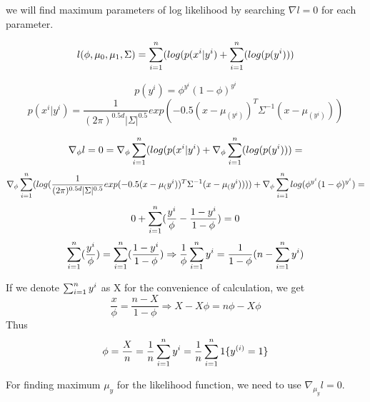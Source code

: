 \begin{answer}
we will find maximum parameters of log likelihood by searching $\nabla l = 0$ for each parameter. 

  \begin{equation*}
      l(\phi,\mu_0, \mu_1, \Sigma) 
      = \sum_{i=1}^{n}(log(p(x^{i}|y^{i}) + \sum_{i=1}^{n}(log(p(y^{i})))
  \end{equation*}
  
  \begin{equation*}
      p(y^{i}) = \phi^{y^{i}}(1-\phi)^{y^{i}}
\end{equation*}
\begin{equation*}
      p(x^{i}|y^{i}) = \frac{1}{(2\pi)^{0.5d}|\Sigma|^{0.5}}exp(-0.5(x-\mu_(y^{i}))^{T}\Sigma^{-1}(x-\mu_(y^{i})))
 \end{equation*}
 
 \begin{equation*}
     \nabla_\phi l = 0 = \nabla_\phi \sum_{i=1}^{n}(log(p(x^{i}|y^{i}) + \nabla_\phi\sum_{i=1}^{n}(log(p(y^{i}))) = 
\end{equation*}
\begin{equation*}
      \nabla_\phi\sum_{i=1}^{n}(log(\frac{1}{(2\pi)^{0.5d}|\Sigma|^{0.5}}exp(-0.5(x-\mu_(y^{i}))^{T}\Sigma^{-1}(x-\mu_(y^{i})))) + \nabla_\phi \sum_{i=1}^{n} log(\phi^{y^{i}}(1-\phi)^{y^{i}}) = 
 \end{equation*} 
 \begin{equation*}
     0 + \sum_{i=1}^{n} (\frac{y^{i}}{\phi} - \frac{1-y^{i}}{1-\phi}) = 0
 \end{equation*}
 \begin{equation*}
     \sum_{i=1}^{n} (\frac{y^{i}}{\phi}) = \sum_{i=1}^{n}( \frac{1-y^{i}}{1-\phi}) \Rightarrow \frac{1}{\phi}\sum_{i=1}^{n} y^{i} = \frac{1}{1-\phi}(n - \sum_{i=1}^{n} y^{i}) 
 \end{equation*}
 
 If we denote $\sum_{i=1}^{n} y^{i}$ as X for the convenience of calculation, we get
 \begin{equation*}
     \frac{x}{\phi} = \frac{n-X}{1-\phi} \Rightarrow X-X\phi = n\phi - X\phi
 \end{equation*}
 Thus
 \begin{equation*}
     \phi = \frac{X}{n} = \frac{1}{n}\sum_{i=1}^{n} y^{i} =  \frac{1}{n}\sum_{i=1}^{n} 1\{y^{(i)} = 1\} \\
 \end{equation*}
 
For finding maximum $\mu_y$ for the likelihood function, we need to use $\nabla_\mu_y l = 0$.


\end{answer}
